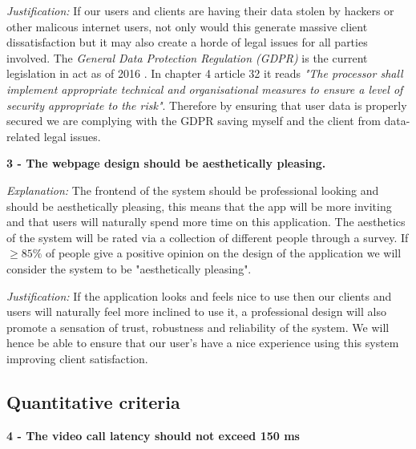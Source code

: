 \vspace{0.1cm}

\textit{Justification:}
If our users and clients are having their data stolen by
hackers or other malicous internet users, not only would this 
generate massive client dissatisfaction but it may also create
a horde of legal issues for all parties involved. The 
\textit{General Data Protection Regulation (GDPR)} is the
current legislation in act as of 2016 \cite{gdpr}. In chapter 4 
article 32 it reads \textit{"The processor shall implement
appropriate technical and organisational measures to ensure
a level of security appropriate to the risk"}. Therefore by 
ensuring that user data is properly secured we are complying 
with the GDPR saving myself and the client from data-related
legal issues.

\vspace{0.2cm}

\textbf{3 - The webpage design should be aesthetically
pleasing.}

\vspace{0.1cm}

\textit{Explanation:} 
The frontend of the system should be professional looking and
should be aesthetically pleasing, this means that the app
will be more inviting and that users will naturally spend more
time on this application. The aesthetics of the system will be
rated via a collection of different people through a survey.
If $\geq 85\%$ of people give a positive opinion on the 
design of the application we will consider the system to be 
"aesthetically pleasing".

\vspace{0.1cm}

\textit{Justification:}
If the application looks and feels nice to use then our 
clients and users will naturally feel more inclined to use it,
a professional design will also promote a sensation of trust,
robustness and reliability of the system. We will hence be
able to ensure that our user's have a nice experience using 
this system improving client satisfaction.

\vspace{0.2cm}

\subsection{Quantitative criteria}

\textbf{4 - The video call latency should not exceed 150 ms}

\vspace{0.1cm}

